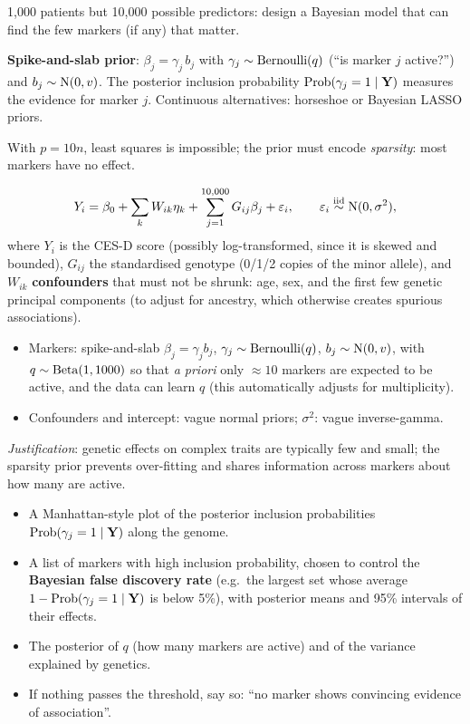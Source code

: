 \documentclass[11pt]{article}
\begin{document}
\begin{restate}
1{,}000 patients but 10{,}000 possible predictors: design a Bayesian model that can find the few markers (if any) that matter.
\end{restate}

\begin{recall}
\textbf{Spike-and-slab prior}: $\beta_j=\gamma_j\,b_j$ with $\gamma_j\sim\mathrm{Bernoulli}(q)$ (``is marker $j$ active?'') and $b_j\sim\mathrm{N}(0,v)$. The posterior inclusion probability $\mathrm{Prob}(\gamma_j=1\mid\mathbf Y)$ measures the evidence for marker $j$. Continuous alternatives: horseshoe or Bayesian LASSO priors.
\end{recall}

\begin{keyidea}
With $p=10n$, least squares is impossible; the prior must encode \emph{sparsity}: most markers have no effect.
\end{keyidea}

\solution
{}
\[
Y_i=\beta_0+\sum_{k}W_{ik}\eta_k+\sum_{j=1}^{10{,}000}G_{ij}\beta_j+\varepsilon_i,\qquad\varepsilon_i\stackrel{\text{iid}}{\sim}\mathrm{N}(0,\sigma^2),
\]
where $Y_i$ is the CES-D score (possibly log-transformed, since it is skewed and bounded), $G_{ij}$ the standardised genotype (0/1/2 copies of the minor allele), and $W_{ik}$ \textbf{confounders} that must not be shrunk: age, sex, and the first few genetic principal components (to adjust for ancestry, which otherwise creates spurious associations).
\begin{itemize}
\item Markers: spike-and-slab $\beta_j=\gamma_jb_j$, $\gamma_j\sim\mathrm{Bernoulli}(q)$, $b_j\sim\mathrm{N}(0,v)$, with $q\sim\mathrm{Beta}(1,1000)$ so that \emph{a priori} only $\approx10$ markers are expected to be active, and the data can learn $q$ (this automatically adjusts for multiplicity).
\item Confounders and intercept: vague normal priors; $\sigma^2$: vague inverse-gamma.
\end{itemize}
\emph{Justification}: genetic effects on complex traits are typically few and small; the sparsity prior prevents over-fitting and shares information across markers about how many are active.

\begin{itemize}
\item A Manhattan-style plot of the posterior inclusion probabilities $\mathrm{Prob}(\gamma_j=1\mid\mathbf Y)$ along the genome.
\item A list of markers with high inclusion probability, chosen to control the \textbf{Bayesian false discovery rate} (e.g.\ the largest set whose average $1-\mathrm{Prob}(\gamma_j=1\mid\mathbf Y)$ is below 5\%), with posterior means and 95\% intervals of their effects.
\item The posterior of $q$ (how many markers are active) and of the variance explained by genetics.
\item If nothing passes the threshold, say so: ``no marker shows convincing evidence of association''.
\end{itemize}
\end{document}
